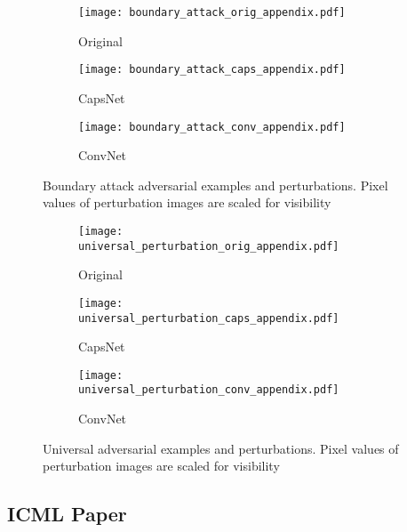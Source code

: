 \begin{figure}
	\centering
	
	\begin{subfigure}{.23\textwidth}
		\centering
		\texttt{[image: boundary\_attack\_orig\_appendix.pdf]}%
		\caption{Original}%
	\end{subfigure}%
	\begin{subfigure}{.36\textwidth}
		\centering
		\texttt{[image: boundary\_attack\_caps\_appendix.pdf]}%
		\caption{CapsNet}
	\end{subfigure}%
	\begin{subfigure}{.36\textwidth}
		\centering
		\texttt{[image: boundary\_attack\_conv\_appendix.pdf]}%
		\caption{ConvNet}
	\end{subfigure}
	\caption[Boundary Attack Adversarial Examples]{Boundary attack adversarial examples and perturbations. Pixel values of perturbation images are scaled for visibility}
	\label{fig:boundary-img}
	
\end{figure}

\begin{figure}
	\centering
	
	\begin{subfigure}{.23\textwidth}
		\centering
		\texttt{[image: universal\_perturbation\_orig\_appendix.pdf]}%
		\caption{Original}%
	\end{subfigure}%
	\begin{subfigure}{.36\textwidth}
		\centering
		\texttt{[image: universal\_perturbation\_caps\_appendix.pdf]}%
		\caption{CapsNet}
	\end{subfigure}%
	\begin{subfigure}{.36\textwidth}
		\centering
		\texttt{[image: universal\_perturbation\_conv\_appendix.pdf]}%
		\caption{ConvNet}
	\end{subfigure}
	\caption[Universal Adversarial Perturbation Adversarial Examples]{Universal adversarial examples and perturbations. Pixel values of perturbation images are scaled for visibility}
	\label{fig:universal-img}
	
\end{figure}

\subsection{ICML Paper}

